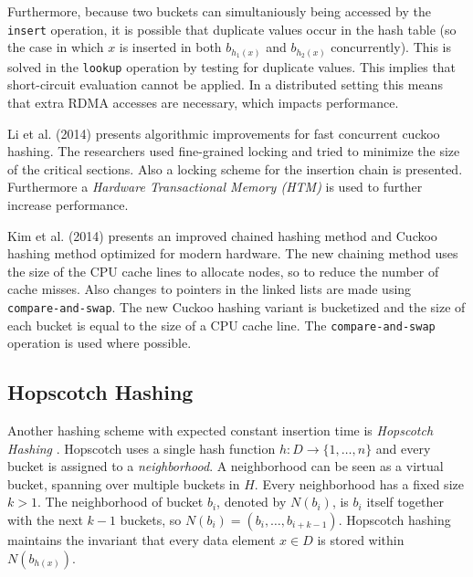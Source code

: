 Furthermore, because two buckets can simultaniously being accessed by the \texttt{insert} operation, it is possible that duplicate values occur in the hash table (so the case in which $x$ is inserted in both $b_{h_1(x)}$ and $b_{h_2(x)}$ concurrently). This is solved in the \texttt{lookup} operation by testing for duplicate values. This implies that short-circuit evaluation cannot be applied. In a distributed setting this means that extra RDMA accesses are necessary, which impacts performance.

Li et al. \cite{Li:2014:AIF:2592798.2592820} (2014) presents algorithmic improvements for fast concurrent cuckoo hashing. The researchers used fine-grained locking and tried to minimize the size of the critical sections. Also a locking scheme for the insertion chain is presented. Furthermore a \emph{Hardware Transactional Memory (HTM)} is used to further increase performance.

Kim et al. \cite{enhanced_chained_cuckoo_hashing} (2014) presents an improved chained hashing method and Cuckoo hashing method optimized for modern hardware. The new chaining method uses the size of the CPU cache lines to allocate nodes, so to reduce the number of cache misses. Also changes to pointers in the linked lists are made using \texttt{compare-and-swap}. The new Cuckoo hashing variant is bucketized and the size of each bucket is equal to the size of a CPU cache line. The \texttt{compare-and-swap} operation is used where possible. 

\subsection{Hopscotch Hashing}
Another hashing scheme with expected constant insertion time is \emph{Hopscotch Hashing} \cite{hopscotch}. Hopscotch uses a single hash function $h : D \rightarrow \{ 1, \dots, n \}$ and every bucket is assigned to a \emph{neighborhood}. A neighborhood can be seen as a virtual bucket, spanning over multiple buckets in $H$. Every neighborhood has a fixed size $k > 1$. The neighborhood of bucket $b_i$, denoted by $N(b_i)$, is $b_i$ itself together with the next $k - 1$ buckets, so $N(b_i) = (b_i, \dots, b_{i + k - 1})$. Hopscotch hashing maintains the invariant that every data element $x \in D$ is stored within $N(b_{h(x)})$.

